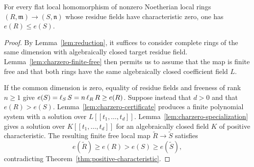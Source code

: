 \begin{theorem}\label{thm:charzero}
For every flat local homomorphism of nonzero Noetherian local rings
$(R,\mathfrak m)\to(S,\mathfrak n)$ whose residue fields have
characteristic zero, one has $e(R)\le e(S)$.
\end{theorem}

\begin{proof}
By Lemma~\ref{lem:reduction}, it suffices to consider complete rings
of the same dimension with algebraically closed target residue field.
Lemma~\ref{lem:charzero-finite-free} then permits us to assume that
the map is finite free and that both rings have the same
algebraically closed coefficient field $L$.

If the common dimension is zero, equality of residue fields and
freeness of rank $n\ge1$ give
$e(S)=\operatorname{\ell}_S S=n\operatorname{\ell}_R R\ge e(R)$.
Suppose instead that $d>0$ and that $e(R)>e(S)$.
Lemma~\ref{lem:charzero-certificate} produces a finite polynomial
system with a solution over $L[[t_1,\ldots,t_d]]$.
Lemma~\ref{lem:charzero-specialization} gives a solution over
$K[[t_1,\ldots,t_d]]$ for an algebraically closed field $K$ of
positive characteristic.  The resulting finite free local map
$\widetilde R\to\widetilde S$ satisfies
\[
 e(\widetilde R)\ge e(R)>e(S)\ge e(\widetilde S),
\]
contradicting Theorem~\ref{thm:positive-characteristic}.
\end{proof}

